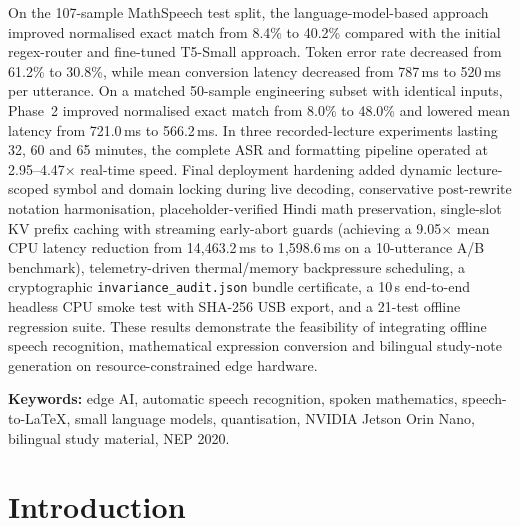 \documentclass[11pt,a4paper,oneside]{report}
\theoremstyle{definition}
\newcommand{\code}[1]{\texttt{\small #1}}
\begin{document}
On the 107-sample MathSpeech test split, the language-model-based approach improved normalised exact match from 8.4\% to 40.2\% compared with the initial regex-router and fine-tuned T5-Small approach. Token error rate decreased from 61.2\% to 30.8\%, while mean conversion latency decreased from 787\,ms to 520\,ms per utterance. On a matched 50-sample engineering subset with identical inputs, Phase~2 improved normalised exact match from 8.0\% to 48.0\% and lowered mean latency from 721.0\,ms to 566.2\,ms. In three recorded-lecture experiments lasting 32, 60 and 65 minutes, the complete ASR and formatting pipeline operated at 2.95--4.47$\times$ real-time speed. Final deployment hardening added dynamic lecture-scoped symbol and domain locking during live decoding, conservative post-rewrite notation harmonisation, placeholder-verified Hindi math preservation, single-slot KV prefix caching with streaming early-abort guards (achieving a 9.05$\times$ mean CPU latency reduction from 14{,}463.2\,ms to 1{,}598.6\,ms on a 10-utterance A/B benchmark), telemetry-driven thermal/memory backpressure scheduling, a cryptographic \code{invariance\_audit.json} bundle certificate, a 10\,s end-to-end headless CPU smoke test with SHA-256 USB export, and a 21-test offline regression suite. These results demonstrate the feasibility of integrating offline speech recognition, mathematical expression conversion and bilingual study-note generation on resource-constrained edge hardware.

\vspace{6pt}
\noindent\textbf{Keywords:} edge AI, automatic speech recognition, spoken mathematics, speech-to-LaTeX, small language models, quantisation, NVIDIA Jetson Orin Nano, bilingual study material, NEP 2020.

\cleardoublepage
{\setlength{\parskip}{0pt}
\renewcommand{\contentsname}{Contents}
\tableofcontents}
\thispagestyle{plain}



\cleardoublepage
{}
\setcounter{page}{1}
\chapter{Introduction}
\label{chap:intro}
\end{document}
